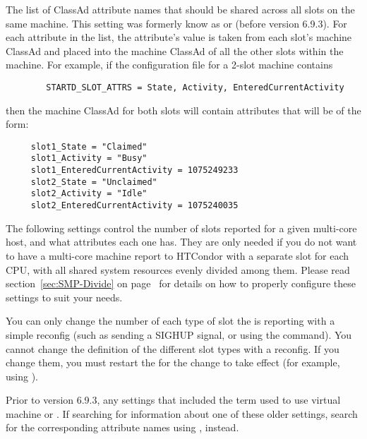 \begin{description}
\label{param:StartdSlotAttrs}
\item[\Macro{STARTD\_SLOT\_ATTRS}]
  The list of ClassAd attribute names that should be shared across all
  slots on the same machine.
  This setting was formerly know as  or
   (before version 6.9.3).
  For each attribute in the list, the attribute's value is taken from
  each slot's machine ClassAd and placed into the machine
  ClassAd of all the other slots within the machine.
  For example, if the configuration file for a 2-slot machine
  contains
\begin{verbatim}
        STARTD_SLOT_ATTRS = State, Activity, EnteredCurrentActivity
\end{verbatim}
  then the machine ClassAd for both slots will contain
  attributes that will be of the form:
\begin{verbatim}
     slot1_State = "Claimed"
     slot1_Activity = "Busy"
     slot1_EnteredCurrentActivity = 1075249233
     slot2_State = "Unclaimed"
     slot2_Activity = "Idle"
     slot2_EnteredCurrentActivity = 1075240035
\end{verbatim}

\end{description}

The following settings control the number of slots reported
for a given multi-core host, and what attributes each one has.  
They are only needed if you do not want to have a multi-core machine report
to HTCondor with a separate slot for each CPU, with all
shared system resources evenly divided among them.
Please read section~\ref{sec:SMP-Divide} on
page~\pageref{sec:SMP-Divide} for details on how to properly configure
these settings to suit your needs.

\Note You can only change the number of each type of slot
the  is reporting with a simple reconfig (such as
sending a SIGHUP signal, or using the  command).
You cannot change the definition of the different slot
types with a reconfig.  
If you change them, you must restart the  for the
change to take effect (for example, using 
).

\Note Prior to version 6.9.3, any settings that included the term
 used to use virtual machine or .
If searching for information about one of these older settings,
search for the corresponding attribute names using , instead.

